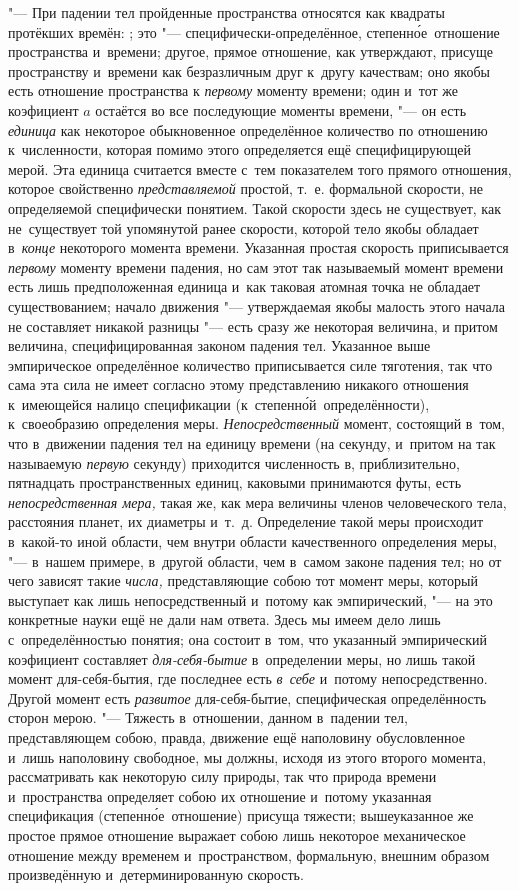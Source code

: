 "--- При падении тел пройденные пространства относятся как квадраты протёкших
времён: ; это "--- специфически-определённое, степенн\'{о}е~отношение
пространства и~времени; другое, прямое отношение, как утверждают, присуще
пространству и~времени как безразличным друг к~другу качествам; оно якобы есть
отношение пространства к {\em первому} моменту времени; один и~тот же
коэфициент $a$ остаётся во все последующие моменты времени, "--- он есть
{\em единица} как некоторое обыкновенное определённое количество по отношению
к~численности, которая помимо этого определяется ещё специфицирующей мерой. Эта
единица считается вместе с~тем показателем того прямого отношения, которое
свойственно {\em представляемой} простой, т.~е. формальной скорости, не
определяемой специфически понятием. Такой скорости здесь не существует, как
не~существует той упомянутой ранее скорости, которой тело якобы обладает
в~{\em конце} некоторого момента времени. Указанная простая скорость
приписывается {\em первому} моменту времени падения, но сам этот так называемый
момент времени есть лишь предположенная единица и~как таковая атомная точка не
обладает существованием; начало движения "--- утверждаемая якобы малость этого
начала не составляет никакой разницы "--- есть сразу же некоторая величина, и
притом величина, специфицированная законом падения тел. Указанное выше
эмпирическое определённое количество приписывается силе тяготения, так что сама
эта сила не имеет согласно этому представлению никакого отношения к~имеющейся
налицо спецификации (к~степенн\'{о}й~определённости), к~своеобразию определения
меры. {\em Непосредственный} момент, состоящий в~том, что в~движении падения
тел на единицу времени (на секунду, и~притом на так называемую {\em первую}
секунду) приходится численность в, приблизительно, пятнадцать пространственных
единиц, каковыми принимаются футы, есть {\em непосредственная мера,} такая же,
как мера величины членов человеческого тела, расстояния планет, их диаметры
и~т.~д. Определение такой меры происходит в~какой-то иной области, чем внутри
области качественного определения меры, "--- в~нашем примере, в~другой области,
чем в~самом законе падения тел; но от чего зависят такие {\em числа,}
представляющие собою тот момент меры, который выступает как лишь
непосредственный и~потому как эмпирический, "--- на это конкретные науки ещё не
дали нам ответа. Здесь мы имеем дело лишь с~определённостью понятия; она
состоит в~том, что указанный эмпирический коэфициент составляет
{\em для-себя-бытие} в~определении меры, но лишь такой момент для-себя-бытия,
где последнее есть {\em в~себе} и~потому непосредственно. Другой момент есть
{\em развитое} для-себя-бытие, специфическая определённость сторон мерою. "---
Тяжесть в~отношении, данном в~падении тел, представляющем собою, правда,
движение ещё наполовину обусловленное и~лишь наполовину свободное, мы должны,
исходя из этого второго момента, рассматривать как некоторую силу природы, так
что природа времени и~пространства определяет собою их отношение и~потому
указанная спецификация (степенн\'{о}е~отношение) присуща тяжести; вышеуказанное
же простое прямое отношение выражает собою лишь некоторое механическое
отношение между временем и~пространством, формальную, внешним образом
произведённую и~детерминированную скорость.

